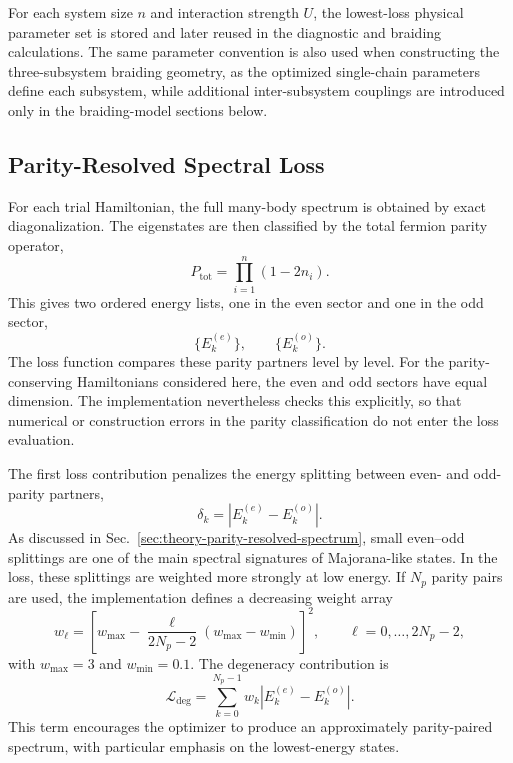 For each system size $n$ and interaction strength $U$, the lowest-loss physical parameter set is stored and later reused in the diagnostic and braiding calculations. The same parameter convention is also used when constructing the three-subsystem braiding geometry, as the optimized single-chain parameters define each subsystem, while additional inter-subsystem couplings are introduced only in the braiding-model sections below.

\subsection{Parity-Resolved Spectral Loss}
For each trial Hamiltonian, the full many-body spectrum is obtained by exact diagonalization. The eigenstates are then classified by the total fermion parity operator,
\begin{equation}
P_{\mathrm{tot}}=\prod_{i=1}^{n}(1-2n_i).
\end{equation}
This gives two ordered energy lists, one in the even sector and one in the odd sector,
\begin{equation}
\{E_k^{(e)}\},
\qquad
\{E_k^{(o)}\}.
\end{equation}
The loss function compares these parity partners level by level. For the parity-conserving Hamiltonians considered here, the even and odd sectors have equal dimension. The implementation nevertheless checks this explicitly, so that numerical or construction errors in the parity classification do not enter the loss evaluation.

The first loss contribution penalizes the energy splitting between even- and odd-parity partners,
\begin{equation}
\delta_k = \left|E_k^{(e)}-E_k^{(o)}\right|.
\end{equation}
As discussed in Sec.~\ref{sec:theory-parity-resolved-spectrum}, small even--odd splittings are one of the main spectral signatures of Majorana-like states. In the loss, these splittings are weighted more strongly at low energy. If $N_p$ parity pairs are used, the implementation defines a decreasing weight array
\begin{equation}
w_{\ell}
=
\left[
w_{\mathrm{max}}
-
\frac{\ell}{2N_p-2}
\left(
w_{\mathrm{max}}-w_{\mathrm{min}}
\right)
\right]^2,
\qquad
\ell=0,\ldots,2N_p-2,
\end{equation}
with $w_{\mathrm{max}}=3$ and $w_{\mathrm{min}}=0.1$. The degeneracy contribution is
\begin{equation}
\mathcal{L}_{\mathrm{deg}}
=
\sum_{k=0}^{N_p-1} w_k \left|E_k^{(e)}-E_k^{(o)}\right|.
\end{equation}
This term encourages the optimizer to produce an approximately parity-paired spectrum, with particular emphasis on the lowest-energy states.


